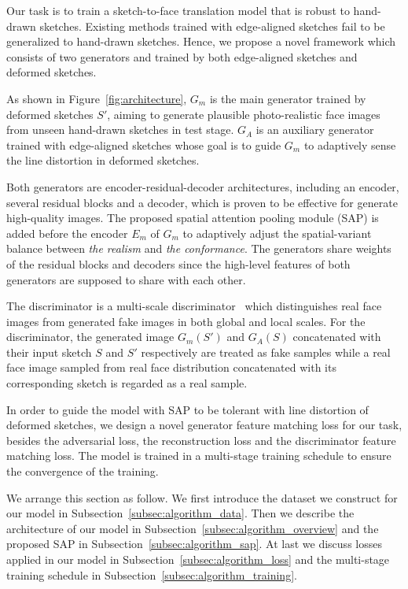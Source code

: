 % 

Our task is to train a sketch-to-face translation model that is robust to hand-drawn sketches. Existing methods trained with edge-aligned sketches fail to be generalized to hand-drawn sketches. Hence, we propose a novel framework which consists of two generators and trained by both edge-aligned sketches and deformed sketches.

As shown in Figure~\ref{fig:architecture}, $G_m$ is the main generator trained by deformed sketches $S'$, aiming to generate plausible photo-realistic face images from unseen hand-drawn sketches in test stage. 
$G_A$ is an auxiliary generator trained with edge-aligned sketches whose goal is to guide $G_m$ to adaptively sense the line distortion in deformed sketches.

Both generators are encoder-residual-decoder architectures, including an encoder, several residual blocks and a decoder, which is proven to be effective for generate high-quality images. 
The proposed spatial attention pooling module (SAP) is added before the encoder $E_m$ of $G_m$ to adaptively adjust the spatial-variant balance between \textit{the realism} and \textit{the conformance}. 
The generators share weights of the residual blocks and decoders since the high-level features of both generators are supposed to share with each other.


%
The discriminator is a multi-scale discriminator~\cite{pix2pixHD} which distinguishes real face images from generated fake images in both global and local scales.
For the discriminator, the generated image $G_m(S')$ and $G_A(S)$ concatenated with their input sketch $S$ and $S'$ respectively are treated as fake samples while a real face image sampled from real face distribution concatenated with its corresponding sketch is regarded as a real sample. 
%

In order to guide the model with SAP to be tolerant with line distortion of deformed sketches, we design a novel generator feature matching loss for our task, besides the adversarial loss, the reconstruction loss and the discriminator feature matching loss. The model is trained in a multi-stage training schedule to ensure the convergence of the training.
%

We arrange this section as follow. We first introduce the dataset we construct for our model in Subsection~\ref{subsec:algorithm_data}.
Then we describe the architecture of our model in Subsection~\ref{subsec:algorithm_overview} and the proposed SAP in Subsection~\ref{subsec:algorithm_sap}.
At last we discuss losses applied in our model in Subsection~\ref{subsec:algorithm_loss} and the multi-stage training schedule in Subsection~\ref{subsec:algorithm_training}.

